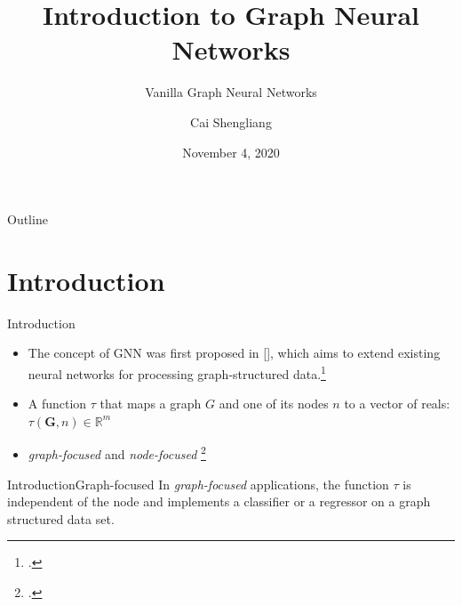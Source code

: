 \documentclass[10pt,aspectratio=169]{beamer}
\title{Introduction to Graph Neural Networks}
\subtitle{Vanilla Graph Neural Networks}
\author{Cai Shengliang}
\institute{Multi-Agent Artificial Intelligence Laboratory}
\date{November 4, 2020}
\begin{document}
\begin{frame}
    \titlepage
\end{frame}

\begin{frame}{Outline}
    \tableofcontents
\end{frame}

\section{Introduction}
\begin{frame}{Introduction}
    \begin{itemize}[<+->]
        \item The concept of GNN was first proposed in \citeauthor{Scarselli2009} [\citeyear{Scarselli2009}], which aims to extend existing neural networks for processing graph-structured data.\footcite{liu2020introduction}
        \item A function $\tau$ that maps a graph $G$ and one of its nodes $n$  to a vector of reals: $\tau(\boldsymbol{G}, n) \in \mathbb{R} ^ m$
        \item \emph{graph-focused} and \emph{node-focused} \footcite{Scarselli2009}
    \end{itemize}
\end{frame}

\begin{frame}{Introduction}{Graph-focused}
    In \emph{graph-focused} applications, the function $\tau$ is independent of the node and implements a classifier or a regressor on a graph structured data set.

    \begin{figure}
        \centering
    \end{figure}
\end{frame}
\end{document}
